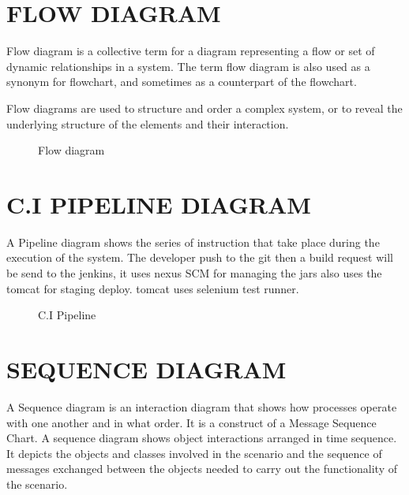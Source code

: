 \documentclass[12pt,a4paper,oneside]{report}
\begin{document}
{\begin{figure}[h]
\end{figure}
\newpage
\section{FLOW DIAGRAM}
Flow diagram is a collective term for a diagram representing a flow or set of dynamic relationships in a system. The term flow diagram is also used as a synonym for flowchart, and sometimes as a counterpart of the flowchart.

Flow diagrams are used to structure and order a complex system, or to reveal the underlying structure of the elements and their interaction.
\begin{figure}[h]
\begin{center}

\hspace{.0 in}
\caption{Flow diagram}
\end{center}

\end{figure}
\pagebreak
\section{C.I PIPELINE DIAGRAM}
A Pipeline diagram shows the series of instruction that take place during the execution of the system. The developer push to the git then a build request will be send to the jenkins, it uses nexus SCM for managing the jars also uses the tomcat for staging deploy. tomcat uses selenium test runner.
\begin{figure}[h]
\begin{center}

\hspace{.0 in}
\caption{C.I Pipeline}
\end{center}

\end{figure}
\pagebreak
\section{SEQUENCE DIAGRAM}
\par A Sequence diagram is an interaction diagram that shows how processes operate with
one another and in what order. It is a construct of a Message Sequence Chart. A sequence
diagram shows object interactions arranged in time sequence. It depicts the objects and classes
involved in the scenario and the sequence of messages exchanged between the objects needed
to carry out the functionality of the scenario.
\begin{figure}[h]
\begin{center}


\end{center}
\end{figure}}
\end{document}
